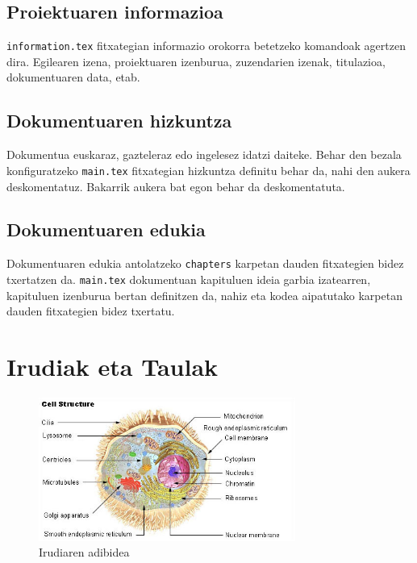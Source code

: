 \subsection{Proiektuaren informazioa}

\texttt{information.tex} fitxategian informazio orokorra betetzeko komandoak agertzen dira. Egilearen izena, proiektuaren izenburua, zuzendarien izenak, titulazioa, dokumentuaren data, etab.

\subsection{Dokumentuaren hizkuntza}

Dokumentua euskaraz, gazteleraz edo ingelesez idatzi daiteke. Behar den bezala konfiguratzeko \texttt{main.tex} fitxategian hizkuntza definitu behar da, nahi den aukera deskomentatuz. Bakarrik aukera bat egon behar da deskomentatuta.



\subsection{Dokumentuaren edukia}

Dokumentuaren edukia antolatzeko \texttt{chapters} karpetan dauden fitxategien bidez txertatzen da. \texttt{main.tex} dokumentuan kapituluen ideia garbia izatearren, kapituluen izenburua bertan definitzen da, nahiz eta kodea aipatutako karpetan dauden fitxategien bidez txertatu.


\section{Irudiak eta Taulak}

\begin{figure}[t]
    \centering
	\includegraphics[width=0.75\textwidth]{figures/cell.jpg}
	\caption{Irudiaren adibidea}\label{fig:adibidea}
\end{figure}

